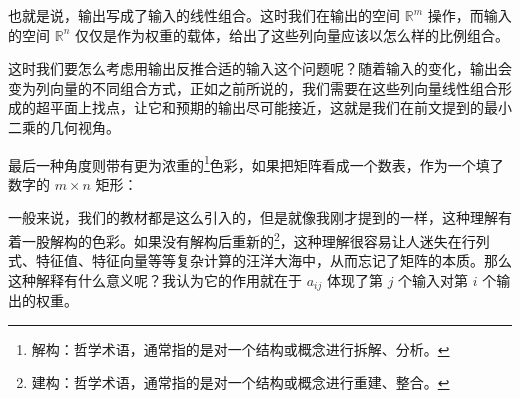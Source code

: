 也就是说，输出写成了输入的线性组合。这时我们在输出的空间 $\mathbb{R}^m$ 操作，而输入的空间 $\mathbb{R}^n$ 仅仅是作为权重的载体，给出了这些列向量应该以怎么样的比例组合。

这时我们要怎么考虑用输出反推合适的输入这个问题呢？随着输入的变化，输出会变为列向量的不同组合方式，正如之前所说的，我们需要在这些列向量线性组合形成的超平面上找点，让它和预期的输出尽可能接近，这就是我们在前文提到的最小二乘的几何视角。

最后一种角度则带有更为浓重的\footnote{解构：哲学术语，通常指的是对一个结构或概念进行拆解、分析。}色彩，如果把矩阵看成一个数表，作为一个填了数字的 $m\times n$ 矩形：
\begin{figure}[H]
    \centering
\end{figure}

一般来说，我们的教材都是这么引入的，但是就像我刚才提到的一样，这种理解有着一股解构的色彩。如果没有解构后重新的\footnote{建构：哲学术语，通常指的是对一个结构或概念进行重建、整合。}，这种理解很容易让人迷失在行列式、特征值、特征向量等等复杂计算的汪洋大海中，从而忘记了矩阵的本质。那么这种解释有什么意义呢？我认为它的作用就在于 $a_{ij}$ 体现了第 $j$ 个输入对第 $i$ 个输出的权重。

